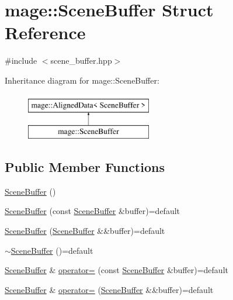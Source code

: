 \hypertarget{structmage_1_1_scene_buffer}{}\section{mage\+:\+:Scene\+Buffer Struct Reference}
\label{structmage_1_1_scene_buffer}


{\ttfamily \#include $<$scene\+\_\+buffer.\+hpp$>$}

Inheritance diagram for mage\+:\+:Scene\+Buffer\+:\begin{figure}[H]
\begin{center}
\leavevmode
\includegraphics[height=2.000000cm]{structmage_1_1_scene_buffer}
\end{center}
\end{figure}
\subsection*{Public Member Functions}
\begin{DoxyCompactItemize}
\item 
\hyperlink{structmage_1_1_scene_buffer_a794ff093bb91a36ca9788ce2db90d140}{Scene\+Buffer} ()
\item 
\hyperlink{structmage_1_1_scene_buffer_aa77aa7851d2183259961c100705d0f3a}{Scene\+Buffer} (const \hyperlink{structmage_1_1_scene_buffer}{Scene\+Buffer} \&buffer)=default
\item 
\hyperlink{structmage_1_1_scene_buffer_ac0ae946e6dae445259a0bc19cd042a08}{Scene\+Buffer} (\hyperlink{structmage_1_1_scene_buffer}{Scene\+Buffer} \&\&buffer)=default
\item 
\hyperlink{structmage_1_1_scene_buffer_a47cb01e808fd210d7cb4ffe7d3cdf4ce}{$\sim$\+Scene\+Buffer} ()=default
\item 
\hyperlink{structmage_1_1_scene_buffer}{Scene\+Buffer} \& \hyperlink{structmage_1_1_scene_buffer_a3b576a5f5511547ba7bf241d22a63a96}{operator=} (const \hyperlink{structmage_1_1_scene_buffer}{Scene\+Buffer} \&buffer)=default
\item 
\hyperlink{structmage_1_1_scene_buffer}{Scene\+Buffer} \& \hyperlink{structmage_1_1_scene_buffer_a2c7c87597f510bd4f964053988c89485}{operator=} (\hyperlink{structmage_1_1_scene_buffer}{Scene\+Buffer} \&\&buffer)=default
\end{DoxyCompactItemize}
